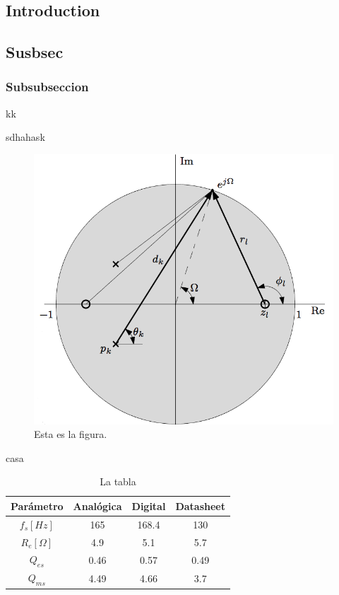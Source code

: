 \documentclass[10pt]{article}
\begin{document}
\begin{multicols*}{2} %

\section{Introduction}


\subsection{Susbsec}
	\subsubsection{Subsubseccion}


	kk


sdhahask
\begin{figure}[H]
	\centering
	\includegraphics[width=\linewidth]{test.png}
	\caption{Esta es la figura.}
	\label{fig:test}
\end{figure}

casa

\begin{table}[H]
	\centering
	\caption{La tabla}
	\label{tab:la}
	\begin{tabular}{|c|c|c|c|}
	\hline
		Parámetro & Analógica & Digital & Datasheet \\
		\hline
		$f_{s}[Hz]$ & 165 & 168.4 & 130\\
		\hline
		$R_{e}[\Omega]$ & 4.9 & 5.1 & 5.7\\
		\hline
		$Q_{es}$ & 0.46 & 0.57 & 0.49\\
		\hline
		$Q_{ms}$ & 4.49 & 4.66 & 3.7\\
		\hline


\end{tabular}
\end{table}
\end{multicols*}
\end{document}
